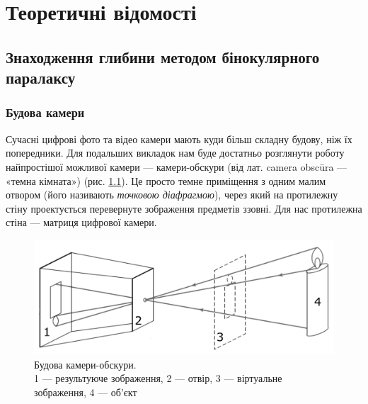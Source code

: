 \chapter{Теоретичні відомості}

\section{Знаходження глибини методом бінокулярного паралаксу}
\subsection{Будова камери}
Сучасні цифрові фото та відео камери мають куди більш складну будову, ніж їх попередники. Для подальших викладок нам буде достатньо розглянути роботу найпростішої можливої камери --- камери-обскури (від лат. camera obscūra --- «темна кімната») (рис. \ref{1.1.1 - Camera-obscura}). Це просто темне приміщення з одним малим отвором (його називають \textit{точковою діафрагмою}), через який на протилежну стіну проектується перевернуте зображення предметів ззовні. Для нас протилежна стіна --- матриця цифрової камери. 
\begin{figure}[H]
	\centering
	\includegraphics[scale = 0.5]{CO2.pdf}
	\caption{Будова камери-обскури.\\ 1 --- результуюче зображення, 2 --- отвір, 3 --- віртуальне зображення, 4 --- об'єкт}
	\label{1.1.1 - Camera-obscura}
\end{figure}


